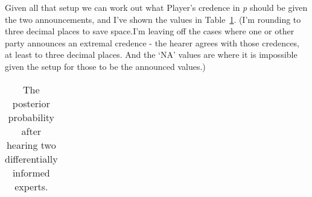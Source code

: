 \documentclass[
  11pt,
  letterpaper,
  DIV=11,
  numbers=noendperiod,
  twoside]{scrartcl}
\begin{document}
Given all that setup we can work out what Player's credence in \emph{p}
should be given the two announcements, and I've shown the values in
Table~\ref{tbl-diffk}. (I'm rounding to three decimal places to save
space.I'm leaving off the cases where one or other party announces an
extremal credence - the hearer agrees with those credences, at least to
three decimal places. And the `NA' values are where it is impossible
given the setup for those to be the announced values.)

\begin{longtable}[]{@{}
  >{\raggedleft\arraybackslash}p{}
  >{\raggedleft\arraybackslash}p{}
  >{\raggedleft\arraybackslash}p{}
  >{\raggedleft\arraybackslash}p{}
  >{\raggedleft\arraybackslash}p{}
  >{\raggedleft\arraybackslash}p{}
  >{\raggedleft\arraybackslash}p{}
  >{\raggedleft\arraybackslash}p{}
  >{\raggedleft\arraybackslash}p{}
  >{\raggedleft\arraybackslash}p{}@{}}

\caption{\label{tbl-diffk}The posterior probability after hearing two
differentially informed experts.}

\tabularnewline


\end{longtable}
\end{document}
